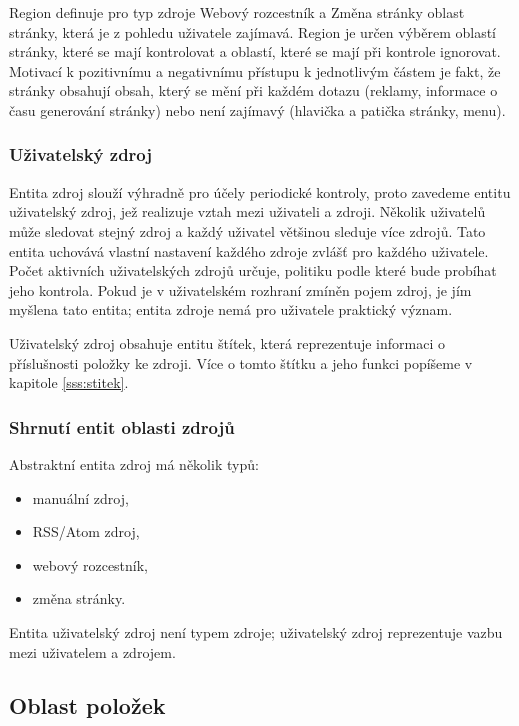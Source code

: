 Region definuje pro typ zdroje Webový rozcestník a Změna stránky oblast stránky, která je z pohledu uživatele zajímavá.
Region je určen výběrem oblastí stránky, které se mají kontrolovat a oblastí, které se mají při kontrole ignorovat.
Motivací k pozitivnímu a negativnímu přístupu k jednotlivým částem je fakt, že stránky obsahují obsah, který se mění při každém dotazu (reklamy, informace o času generování stránky) nebo není zajímavý (hlavička a patička stránky, menu).

\subsubsection{Uživatelský zdroj}
\label{sss:uzivatelsky-zdroj}

Entita zdroj slouží výhradně pro účely periodické kontroly, proto zavedeme entitu uživatelský zdroj, jež realizuje vztah mezi uživateli a zdroji.
Několik uživatelů může sledovat stejný zdroj a každý uživatel většinou sleduje více zdrojů.
Tato entita uchovává vlastní nastavení každého zdroje zvlášť pro každého uživatele.
Počet aktivních uživatelských zdrojů určuje, politiku podle které bude probíhat jeho kontrola.
Pokud je v uživatelském rozhraní zmíněn pojem zdroj, je jím myšlena tato entita; entita zdroje nemá pro uživatele praktický význam.

Uživatelský zdroj obsahuje entitu štítek, která reprezentuje informaci o příslušnosti položky ke zdroji.
Více o tomto štítku a jeho funkci popíšeme v kapitole \ref{sss:stitek}.

\subsubsection{Shrnutí entit oblasti zdrojů}
\label{sss:shrnuti-zdroju}
Abstraktní entita zdroj má několik typů:
\begin{itemize}
	\item manuální zdroj,
	\item RSS/Atom zdroj,
	\item webový rozcestník,
	\item změna stránky.
\end{itemize}
Entita uživatelský zdroj není typem zdroje; uživatelský zdroj reprezentuje vazbu mezi uživatelem a zdrojem.

\subsection{Oblast položek}

